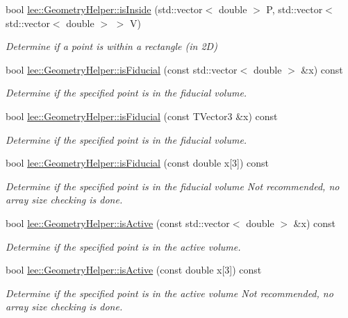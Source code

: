\begin{DoxyCompactItemize}
\item 
bool \hyperlink{group__lee_ga4d4f0303130ac496452b30f60f43f5f1}{lee\-::\-Geometry\-Helper\-::is\-Inside} (std\-::vector$<$ double $>$ P, std\-::vector$<$ std\-::vector$<$ double $>$ $>$ V)
\begin{DoxyCompactList}\small\item\em Determine if a point is within a rectangle (in 2\-D) \end{DoxyCompactList}\item 
bool \hyperlink{group__lee_ga6d02792fc6869b86d850077460536b2a}{lee\-::\-Geometry\-Helper\-::is\-Fiducial} (const std\-::vector$<$ double $>$ \&x) const 
\begin{DoxyCompactList}\small\item\em Determine if the specified point is in the fiducial volume. \end{DoxyCompactList}\item 
bool \hyperlink{group__lee_ga5383a8e03c66e9506a75d9afc41f5ff0}{lee\-::\-Geometry\-Helper\-::is\-Fiducial} (const T\-Vector3 \&x) const 
\begin{DoxyCompactList}\small\item\em Determine if the specified point is in the fiducial volume. \end{DoxyCompactList}\item 
bool \hyperlink{group__lee_gae10d0ef387b7573c6cc12565d5bfd0e1}{lee\-::\-Geometry\-Helper\-::is\-Fiducial} (const double x\mbox{[}3\mbox{]}) const 
\begin{DoxyCompactList}\small\item\em Determine if the specified point is in the fiducial volume Not recommended, no array size checking is done. \end{DoxyCompactList}\item 
bool \hyperlink{group__lee_gaaa423d79bbb62bdd3337f1d965023baa}{lee\-::\-Geometry\-Helper\-::is\-Active} (const std\-::vector$<$ double $>$ \&x) const 
\begin{DoxyCompactList}\small\item\em Determine if the specified point is in the active volume. \end{DoxyCompactList}\item 
bool \hyperlink{group__lee_gab5c3e840d748f5c5340315b6c096e7c8}{lee\-::\-Geometry\-Helper\-::is\-Active} (const double x\mbox{[}3\mbox{]}) const 
\begin{DoxyCompactList}\small\item\em Determine if the specified point is in the active volume Not recommended, no array size checking is done. \end{DoxyCompactList}\item 

\end{DoxyCompactItemize}
